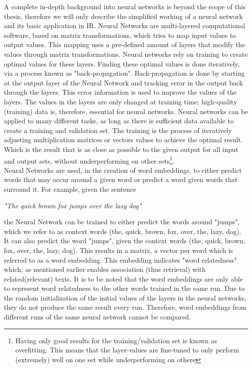 \documentclass[../../Thesis.tex]{subfiles}
\begin{document}
A complete in-depth background into neural networks is beyond the scope of this thesis, therefore we will only describe the simplified working of a neural network and its basic application in IR.
Neural Networks are multi-layered computational software, based on matrix transformations, which tries to map input values to output values. This mapping uses a pre-defined amount of layers that modify the values through matrix transformations. Neural networks rely on training to create optimal values for these layers. Finding these optimal values is done iteratively, via a process known as "back-propagation". Back-propagation is done by starting at the output layer of the Neural Network and tracking error in the output back through the layers. This error information is used to improve the values of the layers. The values in the layers are only changed at training time; high-quality (training) data is, therefore, essential for neural networks. Neural networks can be applied to many different tasks, as long as there is sufficient data available to create a training and validation set. The training is the process of iteratively adjusting multiplication matrices or vectors values to achieve the optimal result. Which is the result that is as close as possible to the given output for all input and output sets, without underperforming on other sets\footnote{Having only good results for the training/validation set is known as overfitting. This means that the layer-values are fine-tuned to only perform (extremely) well on one set while underperforming on others}.\\Neural Networks are used, in the creation of word embeddings, to either predict words that may occur around a given word or predict a word given words that surround it. For example, given the sentence\\
\begin{center}
\textit{"The quick brown fox jumps over the lazy dog"}
\end{center}
the Neural Network can be trained to either predict the words around "jumps", which we refer to as context words (the, quick, brown, fox, over, the, lazy, dog). It can also predict the word "jumps", given the context words (the, quick, brown, fox, over, the, lazy, dog). This results in a matrix, a vector per word which is referred to as a word embedding. This embedding indicates "word relatedness" which, as mentioned earlier enables association (thus retrieval) with related(relevant) texts. It is to be noted that the word embeddings are only able to represent word relatedness to the other words trained in the same run. Due to the random initialization of the initial values of the layers in the neural networks, they do not produce the same result every run. Therefore, word embeddings from different runs of the same neural network cannot be compared.
\end{document}
